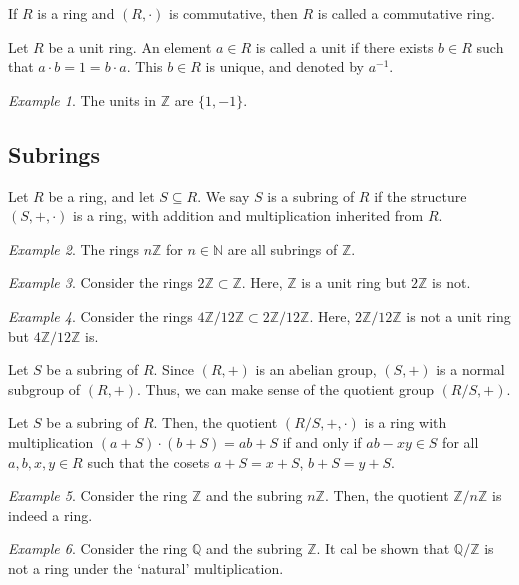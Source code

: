 \documentclass[11pt]{article}
\newcommand{\Q}{\mathbb{Q}}
\newcommand{\Z}{\mathbb{Z}}
\newcommand{\N}{\mathbb{N}}
\theoremstyle{definition}
\theoremstyle{remark}
\newtheorem*{example}{Example}
\numberwithin{equation}{section}
\begin{document}
    \begin{definition}
        If $R$ is a ring and $(R, \cdot)$ is commutative, then $R$ is called a
        commutative ring.
    \end{definition}

    \begin{definition}
        Let $R$ be a unit ring. An element $a \in R$ is called a unit if there exists
        $b \in R$ such that $a\cdot b = 1 = b\cdot a$. This $b \in R$ is unique, and
        denoted by $a^{-1}$.
    \end{definition}
    \begin{example}
        The units in $\Z$ are $\{1, -1\}$.
    \end{example}


    \subsection{Subrings}

    \begin{definition}
        Let $R$ be a ring, and let $S \subseteq R$. We say $S$ is a subring of $R$ if
        the structure $(S, +, \cdot)$ is a ring, with addition and multiplication
        inherited from $R$.
    \end{definition}
    \begin{example}
        The rings $n\Z$ for $n \in \N$ are all subrings of $\Z$.
    \end{example}
    \begin{example}
        Consider the rings $2\Z \subset \Z$. Here, $\Z$ is a unit ring but $2\Z$ is
        not.
    \end{example}
    \begin{example}
        Consider the rings $4\Z/12\Z \subset 2\Z/12\Z$. Here, $2\Z/12\Z$ is not a
        unit ring but $4\Z/12\Z$ is.
    \end{example}

    \begin{lemma}
        Let $S$ be a subring of $R$. Since $(R, +)$ is an abelian group, $(S, +)$ is
        a normal subgroup of $(R, +)$. Thus, we can make sense of the quotient group
        $(R/S, +)$.
    \end{lemma}

    \begin{lemma}
        Let $S$ be a subring of $R$. Then, the quotient $(R/S, +, \cdot)$ is a ring
        with multiplication $(a + S)\cdot(b + S) = ab + S$ if and only if $ab - xy
        \in S$ for all $a, b, x, y \in R$ such that the cosets $a + S = x + S$, $b +
        S = y + S$.
    \end{lemma}
    \begin{example}
        Consider the ring $\Z$ and the subring $n\Z$. Then, the quotient $\Z/n\Z$ is
        indeed a ring.
    \end{example}
    \begin{example}
        Consider the ring $\Q$ and the subring $\Z$. It cal be shown that $\Q/\Z$ is
        not a ring under the `natural' multiplication.
    \end{example}
\end{document}
